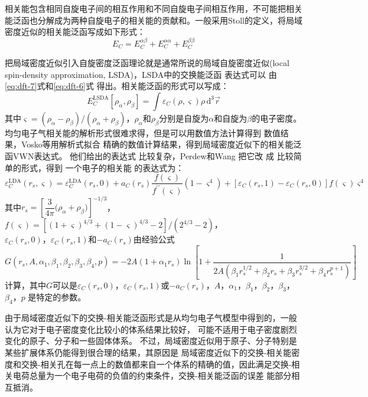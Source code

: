 相关能包含相同自旋电子间的相互作用和不同自旋电子间相互作用，不可能把相关能泛函也分解成为两种自旋电子的相关能的贡献和。一般采用Stoll\cite{TCA49-143_1978}的定义，将局域密度近似的相关能泛函写成如下形式：
\begin{equation}
  E_C=E_C^{\alpha\beta}+E_C^{\alpha\alpha}+E_C^{\beta\beta}
  \label{eq:dft-17}
\end{equation}

把局域密度近似引入自旋密度泛函理论就是通常所说的局域{自旋}密度近似(local spin-density approximation, LSDA)，LSDA中的交换能{泛函}%
{表达}式可以%
{由}\eqref{eq:dft-7}式和\eqref{eq:dft-6}式%
{得}出{。}相关能泛函的形式可以写成：
$$E_C^{\mathrm{LSDA}}[\rho_{\alpha},\rho_{\beta}]=\int{\varepsilon_C(\rho,\varsigma)\rho\,\textrm{d}^3\vec{r}}$$
其中$\varsigma=(\rho_{\alpha}-\rho_{\beta})
/(\rho_{\alpha}+\rho_{\beta})
$，$\rho_{\alpha}$和$\rho_{\beta}$分别是自旋为$\alpha$和自旋为$\beta$的电子密度。均匀电子气相关能的解析形式很难求得，但是可以用数值方法计算得到%
数值结果，Vosko等\cite{CJP58-1200_1980}用解析式拟合%
精确的数值计算结果，得到局域密度近似下的相关能泛函VWN表达式{。}%
他们给出的表达式%
{比较}复杂，Perdew和Wang\cite{PRB45-13244_1992}%
把它改%
成%
{比较}简单的形式，得到%
{一个电子的}相关能%
{的}表达式为：
\begin{equation}
  \label{eq:dft-8}
  \varepsilon_C^{\mathrm{LDA}}(r_s,\varsigma)=\varepsilon_C^{\mathrm{LDA}}(r_s,0)+a_C(r_s)\dfrac{f(\varsigma)}{f^{\prime\prime}(\varsigma)}(1-\varsigma^4)+[\varepsilon_C(r_s,1)-\varepsilon_C(r_s,0)]f(\varsigma)\varsigma^4
\end{equation}
其中$r_s=\left[\dfrac 3{4\pi}\bigl(\rho_{\alpha}+\rho_{\beta}\bigr)\right]^{-1/3}$，$f(\varsigma)=[(1+\varsigma)^{4/3}+(1-\varsigma)^{4/3}-2]/(2^{4/3}-2)$，\\$\varepsilon_C(r_s,0)$，$\varepsilon_C(r_s,1)$和$-a_C(r_s)$由经验公式
$$G(r_s,A,\alpha_1,\beta_1,\beta_2,\beta_3,\beta_4,p)=-2A(1+\alpha_1r_s)\ln\left[1+\dfrac1{2A(\beta_1r_s^{1/2}+\beta_2r_s+\beta_3r_s^{3/2}+\beta_4r_s^{p+1})}\right]$$
计算{，}其中{$G$可以是$\varepsilon_C(r_s,0)$，$\varepsilon_C(r_s,1)$或$-a_C(r_s)$}，$A$，$\alpha_1$，$\beta_1$，$\beta_2$，$\beta_3$，$\beta_4$，$p$%
是{特定的}参数。

由于局域密度近似下的交换-相关能泛函形式是从均匀电子气模型中得到的，一般认为它对于电子密度变化比较小的体系结果比较好，%
{可能}不适用于电子密度剧烈变化的原子、分子和一些固体体系。%
{不过}，局域密度近似用于原子、分子特别是某些扩展体系仍能得到很合理的结果，其原因是%
局域密度近似下的交换-相关能密度和交换-相关孔在每一点上的数值都来自一个体系的精确的值，因此满足交换-相关电荷总量为一个电子电荷的负值的约束条件，交换-相关能泛函的误差%
{能部分}相互抵消。

